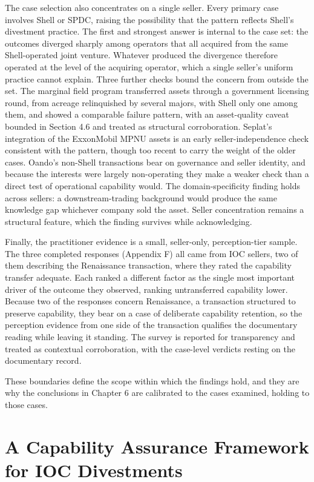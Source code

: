 \documentclass[twoside,fontset=lmodern]{mitthesis}
\begin{document}
The case selection also concentrates on a single seller. Every primary
case involves Shell or SPDC, raising the possibility that the pattern
reflects Shell's divestment practice. The first and strongest answer is
internal to the case set: the outcomes diverged sharply among operators
that all acquired from the same Shell-operated joint venture. Whatever
produced the divergence therefore operated at the level of the acquiring
operator, which a single seller's uniform practice cannot explain. Three
further checks bound the concern from outside the set. The marginal
field program transferred assets through a government licensing round,
from acreage relinquished by several majors, with Shell only one among
them, and showed a comparable failure pattern, with an asset-quality
caveat bounded in Section 4.6 and treated as structural corroboration.
Seplat's integration of the ExxonMobil MPNU assets is an early
seller-independence check consistent with the pattern, though too recent
to carry the weight of the older cases. Oando's non-Shell transactions
bear on governance and seller identity, and because the interests were
largely non-operating they make a weaker check than a direct test of
operational capability would. The domain-specificity finding holds
across sellers: a downstream-trading background would produce the same
knowledge gap whichever company sold the asset. Seller concentration
remains a structural feature, which the finding survives while
acknowledging.

Finally, the practitioner evidence is a small, seller-only,
perception-tier sample. The three completed responses (Appendix F) all
came from IOC sellers, two of them describing the Renaissance
transaction, where they rated the capability transfer adequate. Each
ranked a different factor as the single most important driver of the
outcome they observed, ranking untransferred capability lower. Because
two of the responses concern Renaissance, a transaction structured to
preserve capability, they bear on a case of deliberate capability
retention, so the perception evidence from one side of the transaction
qualifies the documentary reading while leaving it standing. The survey
is reported for transparency and treated as contextual corroboration,
with the case-level verdicts resting on the documentary record.

These boundaries define the scope within which the findings hold, and
they are why the conclusions in Chapter 6 are calibrated to the cases
examined, holding to those cases.


\hypertarget{a-capability-assurance-framework-for-ioc-divestments}{%
\chapter{A Capability Assurance Framework for IOC
Divestments}\label{a-capability-assurance-framework-for-ioc-divestments}}
\end{document}
